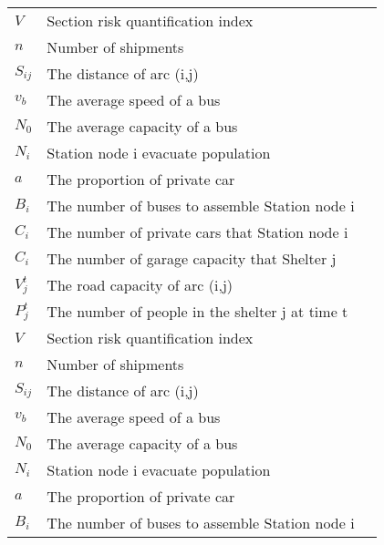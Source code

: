 \documentclass{mcmthesis}
\begin{document}
\begin{center}
\begin{longtable}{p{}p{}m{}}
$V$       & Section risk quantification index                                         \\
$n$       & Number of shipments                                                     \\
$S_{ij}$       & The distance of arc (i,j)                                                \\
$v_b$       & The average speed of a bus                                                \\
$N_0$       & The average capacity of a bus                                             \\
$N_i$       & Station node i evacuate population                                        \\
$a$       & The proportion of private car                                           \\
$B_i$       & The number of buses to assemble Station node i                            \\
$C_i$       & The number of private cars that Station node i                            \\
$C_i$        & The number of garage capacity that Shelter j                             \\
$V_j^t$       & The road capacity of arc (i,j)                                            \\
$P_j^t$       & The number of people in the shelter j at time t                          \\
$V$       & Section risk quantification index                                         \\
$n$       & Number of shipments                                                     \\
$S_{ij}$       & The distance of arc (i,j)                                                \\
$v_b$       & The average speed of a bus                                                \\
$N_0$       & The average capacity of a bus                                             \\
$N_i$       & Station node i evacuate population                                        \\
$a$       & The proportion of private car                                           \\
$B_i$       & The number of buses to assemble Station node i                            \\

\end{longtable}
\end{center}
\end{document}
